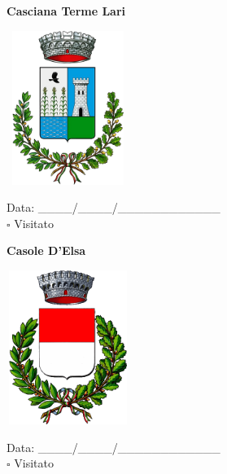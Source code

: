 \documentclass[a5paper,12pt]{article}
\begin{document}
\vspace{0.7cm}

\noindent
\begin{minipage}[t]{0.45\textwidth}
    \begin{center}
        \textbf{Casciana Terme Lari}
    \end{center}
    \vspace{-0.5cm} %
    \begin{center}
        \includegraphics[height= 5cm, width=4cm]{Toscana/Stemma Casciana Terme Lari.png}
    \end{center}
    \vspace{-0.4cm} %
    \begin{flushleft}
        Data: \_\_\_\_/\_\_\_\_/\_\_\_\_\_\_\_\_\_\_\_\_ \\
        $\square$ Visitato
    \end{flushleft}
\end{minipage}
\hfill
\noindent
\begin{minipage}[t]{0.45\textwidth}
    \begin{center}
        \textbf{Casole D'Elsa}
    \end{center}
    \vspace{-0.5cm} %
    \begin{center}
        \includegraphics[height= 5cm, width=4cm]{Toscana/Stemma Casole d'Elsa.png}
    \end{center}
    \vspace{-0.4cm} %
    \begin{flushleft}
        Data: \_\_\_\_/\_\_\_\_/\_\_\_\_\_\_\_\_\_\_\_\_ \\
        $\square$ Visitato
    \end{flushleft}
\end{minipage}
\end{document}
